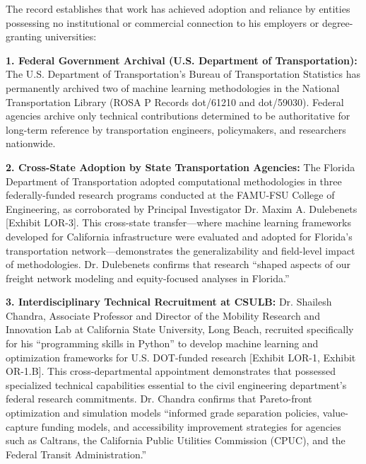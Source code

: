 The record establishes that \drs work has achieved adoption and reliance by entities possessing no institutional or commercial connection to his employers or degree-granting universities:

\textbf{1. Federal Government Archival (U.S. Department of Transportation):} The U.S. Department of Transportation's Bureau of Transportation Statistics has permanently archived two of \drs machine learning methodologies in the National Transportation Library (ROSA P Records dot/61210 and dot/59030). Federal agencies archive only technical contributions determined to be authoritative for long-term reference by transportation engineers, policymakers, and researchers nationwide.

\textbf{2. Cross-State Adoption by State Transportation Agencies:} The Florida Department of Transportation adopted \drs computational methodologies in three federally-funded research programs conducted at the FAMU-FSU College of Engineering, as corroborated by Principal Investigator Dr. Maxim A. Dulebenets [Exhibit LOR-3]. This cross-state transfer---where machine learning frameworks developed for California infrastructure were evaluated and adopted for Florida's transportation network---demonstrates the generalizability and field-level impact of \drs methodologies. Dr. Dulebenets confirms that \drs research ``shaped aspects of our freight network modeling and equity-focused analyses in Florida.''

\textbf{3. Interdisciplinary Technical Recruitment at CSULB:} Dr. Shailesh Chandra, Associate Professor and Director of the Mobility Research and Innovation Lab at California State University, Long Beach, recruited \dr specifically for his ``programming skills in Python'' to develop machine learning and optimization frameworks for U.S. DOT-funded research [Exhibit LOR-1, Exhibit OR-1.B]. This cross-departmental appointment demonstrates that \dr possessed specialized technical capabilities essential to the civil engineering department's federal research commitments. Dr. Chandra confirms that \drs Pareto-front optimization and simulation models ``informed grade separation policies, value-capture funding models, and accessibility improvement strategies for agencies such as Caltrans, the California Public Utilities Commission (CPUC), and the Federal Transit Administration.''

